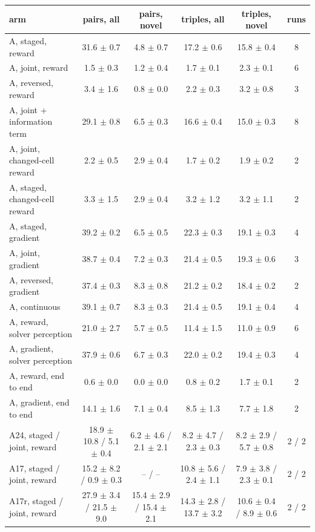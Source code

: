 \begin{tabular}{lccccc}\toprule
arm & pairs, all & pairs, novel & triples, all & triples, novel & runs \\ \midrule
A, staged, reward & 31.6 $\pm$ 0.7 & 4.8 $\pm$ 0.7 & 17.2 $\pm$ 0.6 & 15.8 $\pm$ 0.4 & 8 \\
A, joint, reward & 1.5 $\pm$ 0.3 & 1.2 $\pm$ 0.4 & 1.7 $\pm$ 0.1 & 2.3 $\pm$ 0.1 & 6 \\
A, reversed, reward & 3.4 $\pm$ 1.6 & 0.8 $\pm$ 0.0 & 2.2 $\pm$ 0.3 & 3.2 $\pm$ 0.8 & 3 \\
A, joint + information term & 29.1 $\pm$ 0.8 & 6.5 $\pm$ 0.3 & 16.6 $\pm$ 0.4 & 15.0 $\pm$ 0.3 & 8 \\
A, joint, changed-cell reward & 2.2 $\pm$ 0.5 & 2.9 $\pm$ 0.4 & 1.7 $\pm$ 0.2 & 1.9 $\pm$ 0.2 & 2 \\
A, staged, changed-cell reward & 3.3 $\pm$ 1.5 & 2.9 $\pm$ 0.4 & 3.2 $\pm$ 1.2 & 3.2 $\pm$ 1.1 & 2 \\
A, staged, gradient & 39.2 $\pm$ 0.2 & 6.5 $\pm$ 0.5 & 22.3 $\pm$ 0.3 & 19.1 $\pm$ 0.3 & 4 \\
A, joint, gradient & 38.7 $\pm$ 0.4 & 7.2 $\pm$ 0.3 & 21.4 $\pm$ 0.5 & 19.3 $\pm$ 0.6 & 3 \\
A, reversed, gradient & 37.4 $\pm$ 0.3 & 8.3 $\pm$ 0.8 & 21.2 $\pm$ 0.2 & 18.4 $\pm$ 0.2 & 2 \\
A, continuous & 39.1 $\pm$ 0.7 & 8.3 $\pm$ 0.3 & 21.4 $\pm$ 0.5 & 19.1 $\pm$ 0.4 & 4 \\
A, reward, solver perception & 21.0 $\pm$ 2.7 & 5.7 $\pm$ 0.5 & 11.4 $\pm$ 1.5 & 11.0 $\pm$ 0.9 & 6 \\
A, gradient, solver perception & 37.9 $\pm$ 0.6 & 6.7 $\pm$ 0.3 & 22.0 $\pm$ 0.2 & 19.4 $\pm$ 0.3 & 4 \\
A, reward, end to end & 0.6 $\pm$ 0.0 & 0.0 $\pm$ 0.0 & 0.8 $\pm$ 0.2 & 1.7 $\pm$ 0.1 & 2 \\
A, gradient, end to end & 14.1 $\pm$ 1.6 & 7.1 $\pm$ 0.4 & 8.5 $\pm$ 1.3 & 7.7 $\pm$ 1.8 & 2 \\
A24, staged / joint, reward & 18.9 $\pm$ 10.8 / 5.1 $\pm$ 0.4 & 6.2 $\pm$ 4.6 / 2.1 $\pm$ 2.1 & 8.2 $\pm$ 4.7 / 2.3 $\pm$ 0.3 & 8.2 $\pm$ 2.9 / 5.7 $\pm$ 0.8 & 2 / 2 \\
A17, staged / joint, reward & 15.2 $\pm$ 8.2 / 0.9 $\pm$ 0.3 & -- / -- & 10.8 $\pm$ 5.6 / 2.4 $\pm$ 1.1 & 7.9 $\pm$ 3.8 / 2.3 $\pm$ 0.1 & 2 / 2 \\
A17r, staged / joint, reward & 27.9 $\pm$ 3.4 / 21.5 $\pm$ 9.0 & 15.4 $\pm$ 2.9 / 15.4 $\pm$ 2.1 & 14.3 $\pm$ 2.8 / 13.7 $\pm$ 3.2 & 10.6 $\pm$ 0.4 / 8.9 $\pm$ 0.6 & 2 / 2 \\

\end{tabular}
